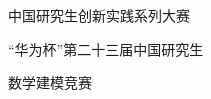 \documentclass[border=0pt]{standalone}
\newcommand\jieshu{第二十三届}
\begin{document}
%
\begin{minipage}{318.64pt}%
\centering\bfseries
{\fontsize{18}{24.5}\selectfont 中国研究生创新实践系列大赛\par}
{\fontsize{21.96}{27.5}\selectfont “华为杯”\jieshu 中国研究生\par}
{\fontsize{21.96}{27.5}\selectfont 数学建模竞赛\par}
\end{minipage}%
\end{document}
